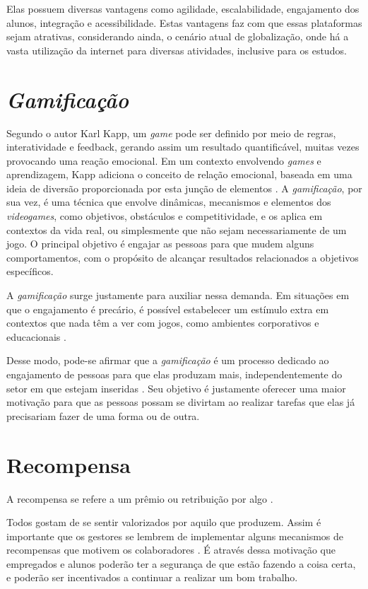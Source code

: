 \documentclass[
    12pt,               %
    openright,          %
    oneside,
    a4paper,            %
    english,            %
    brazil              %
    ]{ifsp-spo-inf-ctds} %
\begin{document}
Elas possuem diversas vantagens como agilidade, escalabilidade, engajamento dos alunos, integração e acessibilidade. Estas vantagens faz com que essas plataformas sejam atrativas, considerando ainda, o cenário atual de globalização, onde há a vasta utilização da internet para diversas atividades, inclusive para os estudos.


\section{\textit{Gamificação}}
Segundo o autor Karl Kapp, um \textit{game} pode ser definido por meio de regras, interatividade e \gls{feedback}, gerando assim um resultado quantificável, muitas vezes provocando uma reação emocional. Em um contexto envolvendo \textit{games} e aprendizagem, Kapp adiciona o conceito de relação emocional, baseada em uma ideia de diversão proporcionada por esta junção de elementos \cite{gamification-of-learning:2012}.
A \textit{gamificação}, por sua vez, é uma técnica que envolve dinâmicas, mecanismos e elementos dos \textit{videogames}, como objetivos, obstáculos e competitividade, e os aplica em contextos da vida real, ou simplesmente que não sejam necessariamente de um jogo. O principal objetivo é engajar as pessoas para que mudem alguns comportamentos, com o propósito de alcançar resultados relacionados a objetivos específicos.


A \textit{gamificação} surge justamente para auxiliar nessa demanda. Em situações em que o engajamento é precário, é possível estabelecer um estímulo extra em contextos que nada têm a ver com jogos, como ambientes corporativos e educacionais
\cite{gamificacao-corporativa:2017}.


Desse modo, pode-se afirmar que a \textit{gamificação} é um processo dedicado ao engajamento de pessoas para que elas produzam mais, independentemente do setor em que estejam inseridas
\cite{gamificacao-corporativa:2017}. Seu objetivo é justamente oferecer uma maior motivação para que as pessoas possam se divirtam ao realizar tarefas que elas já precisariam fazer de uma forma ou de outra.


\section{Recompensa}
A recompensa se refere a um prêmio ou retribuição por algo \cite{dicio-recompensa:2009}.


Todos gostam de se sentir valorizados por aquilo que produzem. Assim é importante que os gestores se lembrem de implementar alguns mecanismos de recompensas que motivem os colaboradores \cite{gamificacao-corporativa:2017}. É através dessa motivação que empregados e alunos poderão ter a segurança de que estão fazendo a coisa certa, e poderão ser incentivados a continuar a realizar um bom trabalho.
\end{document}

